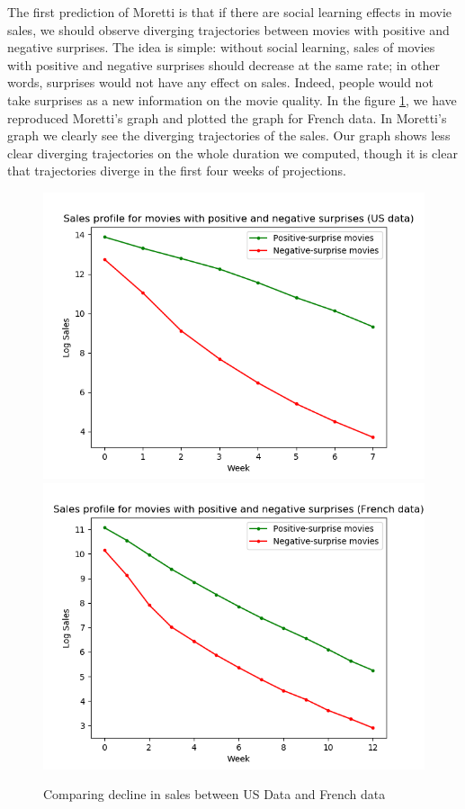 The first prediction of Moretti is that if there are social learning effects in movie sales, we should observe diverging trajectories between movies with positive and negative surprises. The idea is simple: without social learning, sales of movies with positive and negative surprises should decrease at the same rate; in other words, surprises would not have any effect on sales. Indeed, people would not take surprises as a new information on the movie quality. In the figure \ref{part2.1_plot_moretti}, we have reproduced Moretti's graph and plotted the graph for French data. In Moretti's graph we clearly see the diverging trajectories of the sales. Our graph shows less clear diverging trajectories on the whole duration we computed, though it is clear that trajectories diverge in the first four weeks of projections.
\begin{figure}[!htbp]\centering
	\caption{Comparing decline in sales between US Data and French data}
	\label{part2.1_plot_moretti}
	\includegraphics[scale=0.5]{sales_us.png}
	\includegraphics[scale=0.5]{sales_french.png}
\end{figure}

